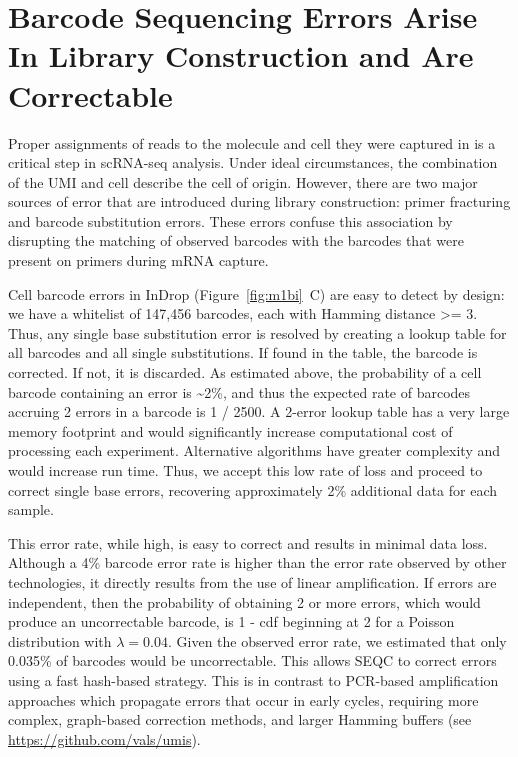 \section{Barcode Sequencing Errors Arise In Library Construction and Are Correctable} \label{error_correction}

Proper assignments of reads to the molecule and cell they were captured in is a critical step in scRNA-seq analysis. 
Under ideal circumstances, the combination of the UMI and cell describe the cell of origin. 
However, there are two major sources of error that are introduced during library construction: primer fracturing and barcode substitution errors. 
These errors confuse this association by disrupting the matching of observed barcodes with the barcodes that were present on primers during mRNA capture. 

Cell barcode errors in InDrop (Figure~\ref{fig:m1bi}~C) are easy to detect by design: we have a whitelist of 147,456 barcodes, each with Hamming distance \textgreater{}= 3. 
Thus, any single base substitution error is resolved by creating a lookup table for all barcodes and all single substitutions. 
If found in the table, the barcode is corrected.  
If not, it is discarded. 
As estimated above, the probability of a cell barcode containing an error is \textasciitilde{}2\%, and thus the expected rate of barcodes accruing 2 errors in a barcode is 1 / 2500. 
A 2-error lookup table has a very large memory footprint and would significantly increase computational cost of processing each experiment.  
Alternative algorithms have greater complexity and would increase run time. 
Thus, we accept this low rate of loss and proceed to correct single base errors, recovering approximately 2\% additional data for each sample.  

This error rate, while high, is easy to correct and results in minimal data loss. 
Although a 4\% barcode error rate is higher than the error rate observed by other technologies, it directly results from the use of linear amplification. 
If errors are independent, then the probability of obtaining 2 or more errors, which would produce an uncorrectable barcode,  is 1 - cdf beginning at 2 for a Poisson distribution with $\lambda = 0.04$. 
Given the observed error rate, we estimated that only 0.035\% of barcodes would be uncorrectable.
This allows SEQC to correct errors using a fast hash-based strategy. 
This is in contrast to PCR-based amplification approaches which propagate errors that occur in early cycles, requiring more complex, graph-based correction methods, and larger Hamming buffers (see \href{https://github.com/vals/umis}{https://github.com/vals/umis}).

